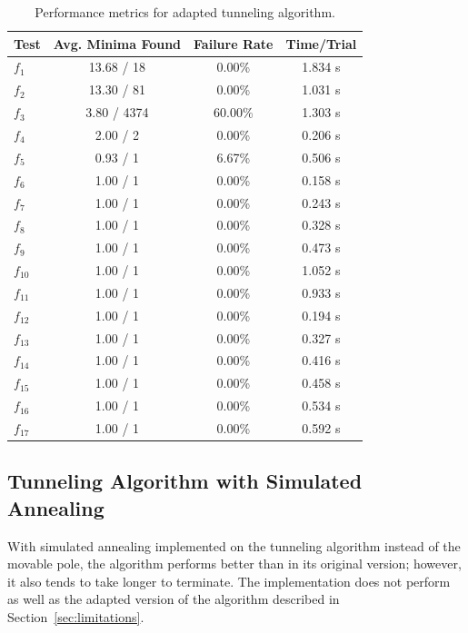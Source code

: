 \documentclass[a4paper,12pt,twoside]{article}
\begin{document}
\begin{table}[H]
    \centering
    \begin{tabular}{lccc}
        \hline
        \textbf{Test} & \textbf{Avg. Minima Found} & \textbf{Failure Rate} & \textbf{Time/Trial} \\
        \hline
        $f_1$ & 13.68 / 18 & 0.00\% & 1.834 s \\
        $f_2$ & 13.30 / 81 & 0.00\% & 1.031 s \\
        $f_3$ & 3.80 / 4374 & 60.00\% & 1.303 s \\
        $f_4$ & 2.00 / 2 & 0.00\% & 0.206 s \\
        $f_5$ & 0.93 / 1 & 6.67\% & 0.506 s \\
        $f_6$ & 1.00 / 1 & 0.00\% & 0.158 s \\
        $f_7$ & 1.00 / 1 & 0.00\% & 0.243 s \\
        $f_8$ & 1.00 / 1 & 0.00\% & 0.328 s \\
        $f_9$ & 1.00 / 1 & 0.00\% & 0.473 s \\
        $f_{10}$ & 1.00 / 1 & 0.00\% & 1.052 s \\
        $f_{11}$ & 1.00 / 1 & 0.00\% & 0.933 s \\
        $f_{12}$ & 1.00 / 1 & 0.00\% & 0.194 s \\
        $f_{13}$ & 1.00 / 1 & 0.00\% & 0.327 s \\
        $f_{14}$ & 1.00 / 1 & 0.00\% & 0.416 s \\
        $f_{15}$ & 1.00 / 1 & 0.00\% & 0.458 s \\
        $f_{16}$ & 1.00 / 1 & 0.00\% & 0.534 s \\
        $f_{17}$ & 1.00 / 1 & 0.00\% & 0.592 s \\
        \hline
    \end{tabular}
    \caption{Performance metrics for adapted tunneling algorithm.}
    \label{tab:adapted}
\end{table}

\subsection{Tunneling Algorithm with Simulated Annealing} \label{sec:annealing}

With simulated annealing implemented on the tunneling algorithm instead of the movable pole, the algorithm performs better than in its original version; however, it also tends to take longer to terminate. The implementation does not perform as well as the adapted version of the algorithm described in Section~\ref{sec:limitations}.
\end{document}
